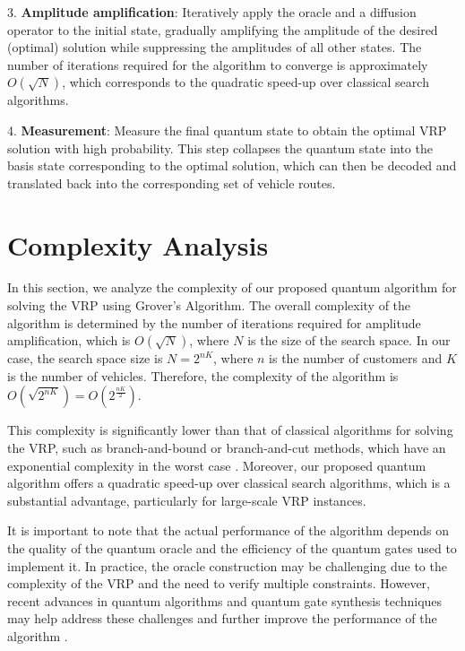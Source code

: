 3. \textbf{Amplitude amplification}: Iteratively apply the oracle and a diffusion operator to the initial state, gradually amplifying the amplitude of the desired (optimal) solution while suppressing the amplitudes of all other states. The number of iterations required for the algorithm to converge is approximately $O(\sqrt{N})$, which corresponds to the quadratic speed-up over classical search algorithms.

4. \textbf{Measurement}: Measure the final quantum state to obtain the optimal VRP solution with high probability. This step collapses the quantum state into the basis state corresponding to the optimal solution, which can then be decoded and translated back into the corresponding set of vehicle routes.

\section{Complexity Analysis}
\label{analysis}

In this section, we analyze the complexity of our proposed quantum algorithm for solving the VRP using Grover's Algorithm. The overall complexity of the algorithm is determined by the number of iterations required for amplitude amplification, which is $O(\sqrt{N})$, where $N$ is the size of the search space. In our case, the search space size is $N=2^{nK}$, where $n$ is the number of customers and $K$ is the number of vehicles. Therefore, the complexity of the algorithm is $O(\sqrt{2^{nK}})=O(2^{\frac{nK}{2}})$.

This complexity is significantly lower than that of classical algorithms for solving the VRP, such as branch-and-bound or branch-and-cut methods, which have an exponential complexity in the worst case \cite{toth2002vehicle}. Moreover, our proposed quantum algorithm offers a quadratic speed-up over classical search algorithms, which is a substantial advantage, particularly for large-scale VRP instances.

It is important to note that the actual performance of the algorithm depends on the quality of the quantum oracle and the efficiency of the quantum gates used to implement it. In practice, the oracle construction may be challenging due to the complexity of the VRP and the need to verify multiple constraints. However, recent advances in quantum algorithms and quantum gate synthesis techniques may help address these challenges and further improve the performance of the algorithm \cite{nielsen2000quantum, kliuchnikov2013synthesis}.

